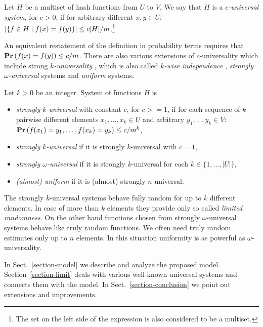 \begin{definition}
\label{definition-c-universal-system}
Let $H$ be a multiset of hash functions from $U$ to $V$. We say that $H$ is a \emph{$c$-universal system}, for $c > 0$, if for arbitrary different $x, y \in U$: $\left|\lbrace f \in H \mid f(x) = f(y) \rbrace\right| \leq {c|H|}/{m}$.\footnote{The set on the left side of the expression is also considered to be a multiset.}
\end{definition}

An equivalent restatement of the definition in probability terms requires that $\mathbf{Pr}\left(f(x) = f(y)\right) \leq c/m$. There are also various extensions of $c$-universality which include strong \emph{$k$-universality} \cite{DBLP:conf/focs/WegmanC79}, which is also called \emph{$k$-wise independence} \cite{DBLP:conf/focs/WegmanC79}, \emph{strongly $\omega$-universal} \cite{DBLP:conf/focs/WegmanC79} systems and \emph{uniform} \cite{DBLP:journals/siamcomp/PaghP08} systems.
\begin{definition}
Let $k > 0$ be an integer. System of functions $H$ is
\begin{itemize}
	\item \emph{strongly $k$-universal} with constant $c$, for $c >= 1$, if for each sequence of $k$ pairwise different elements $x_1, \dots, x_k \in U$ and arbitrary $y_1, \dots, y_k \in V$: $\mathbf{Pr}\left(f(x_1) = y_1, \dots, f(x_k) = y_k\right) \leq {c}/{m^k}$,
	\item \emph{strongly $k$-universal} if it is strongly $k$-universal with $c = 1$,
	\item \emph{strongly $\omega$-universal} if it is strongly $k$-universal for each $k \in \{1, \dots, |U|\}$,
	\item \emph{(almost) uniform} if it is (almost) strongly $n$-universal.
\end{itemize}
\end{definition}

The strongly $k$-universal systems behave fully random for up to $k$ different elements. 
In case of more than $k$ elements they provide only so called \emph{limited randomness}. 
On the other hand functions chosen from strongly $\omega$-universal systems behave like truly random functions. 
We often need truly random estimates only up to $n$ elements.
In this situation uniformity is as powerful as $\omega$-universality.

In Sect.~\ref{section-model} we describe and analyze the proposed model. Section~\ref{section-limit} deals with various well-known universal systems and connects them with the model. In Sect.~\ref{section-conclusion} we point out extensions and improvements.
